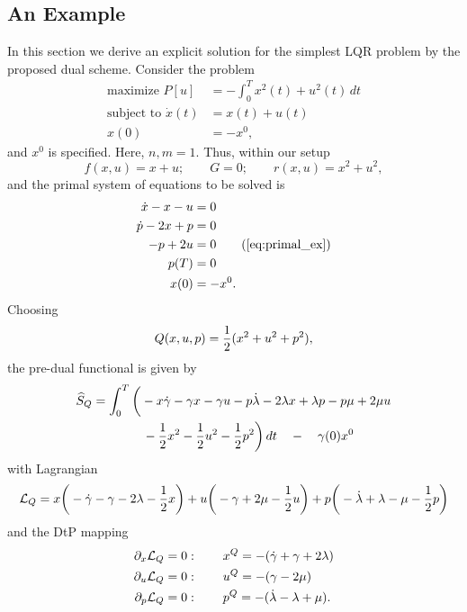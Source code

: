 \documentclass[11pt]{article}
\begin{document}
\subsection{An Example}
In this section we derive an explicit solution for the simplest LQR problem by the proposed dual scheme. Consider the problem
\begin{equation*}
    \begin{aligned}
        \mbox{maximize } P[u] & = - \int_0^T x^2(t) + u^2(t) \, dt \\
        \mbox{subject to } \dot{x}(t) & = x(t) + u(t) \\
         x(0) & = - x^0,     
    \end{aligned}
\end{equation*}
and $x^0$ is specified. Here, $n,m = 1$.
Thus, within our setup
\[
f(x,u) = x + u; \qquad G = 0; \qquad r(x,u) = x^2 + u^2,
\]
and the primal system of equations to be solved is
\begin{subequations}\label{eq:primal_ex}
    \begin{align}
        \dot{x} - x - u & = 0 \notag\\
        \dot{p} - 2x + p & = 0 \notag\\
        - p + 2 u & = 0 \tag{\ref{eq:primal_ex}}\\
        p(T) & = 0 \notag\\
        x(0) & = - x^0. \notag
    \end{align}
\end{subequations}
Choosing
\[
Q(x,u,p) = \frac{1}{2} (x^2 + u^2 + p^2),
\]
the pre-dual functional is given by
\begin{subequations}
    \begin{align}
        \widehat{S}_Q & = \int_0^T \bigg( - x \dot{\gamma} - \gamma x - \gamma u 
                    - p \dot{\lambda} - 2 \lambda x + \lambda p - p \mu + 2 \mu u \notag\\
                      & \qquad \qquad - \frac{1}{2} x^2 - \frac{1}{2} u^2 - \frac{1}{2} p^2 \bigg) \, dt \quad - \quad \gamma(0) x^0 \notag
    \end{align}
\end{subequations}
with Lagrangian
\[
\mathcal{L}_Q = x \bigg(- \dot{\gamma} - \gamma - 2 \lambda - \frac{1}{2} x \bigg) + u \bigg( - \gamma + 2 \mu - \frac{1}{2} u \bigg) + p \bigg( - \dot{\lambda} + \lambda - \mu - \frac{1}{2} p \bigg)
\]
and the DtP mapping
\begin{subequations}
    \begin{align}
        \partial_x \mathcal{L}_Q & = 0 : \qquad x^Q = - (\dot{\gamma} + \gamma + 2 \lambda) \notag\\
        \partial_u \mathcal{L}_Q & = 0:  \qquad u^Q = -(\gamma - 2 \mu) \notag\\
        \partial_p \mathcal{L}_Q & = 0: \qquad p^Q = -(\dot{\lambda} - \lambda + \mu). \notag
    \end{align}
\end{subequations}
\end{document}
